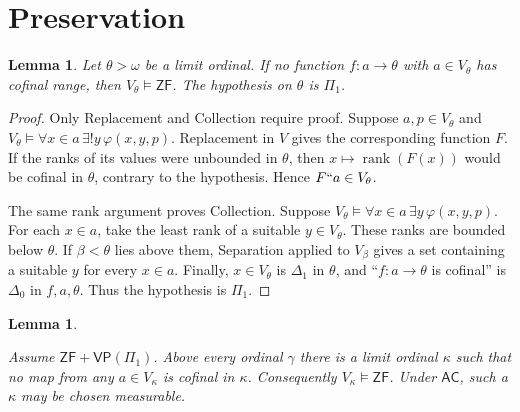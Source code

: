 \documentclass[11pt,a4paper]{amsart}
\newcommand{\VP}{\mathsf{VP}}
\newcommand{\AC}{\mathsf{AC}}
\newcommand{\ZF}{\mathsf{ZF}}
\newcommand{\rank}{\operatorname{rank}}
\theoremstyle{plain}
\newtheorem{lemma}[theorem]{Lemma}
\theoremstyle{definition}
\theoremstyle{remark}
\begin{document}
\section{Preservation}

\begin{lemma}\label{lem:ZF-rank-criterion}
Let $\theta>\omega$ be a limit ordinal.  If no function $f:a\to\theta$ with $a\in V_\theta$ has cofinal range, then $V_\theta\models\ZF$.  The hypothesis on $\theta$ is $\Pi_1$.
\end{lemma}

\begin{proof}
Only Replacement and Collection require proof.  Suppose $a,p\in V_\theta$ and $V_\theta\models\forall x\in a\,\exists!y\,\varphi(x,y,p)$.  Replacement in $V$ gives the corresponding function $F$.  If the ranks of its values were unbounded in $\theta$, then $x\mapsto\rank(F(x))$ would be cofinal in $\theta$, contrary to the hypothesis.  Hence $F``a\in V_\theta$.

The same rank argument proves Collection.  Suppose $V_\theta\models\forall x\in a\,\exists y\,\varphi(x,y,p)$.  For each $x\in a$, take the least rank of a suitable $y\in V_\theta$.  These ranks are bounded below $\theta$.  If $\beta<\theta$ lies above them, Separation applied to $V_\beta$ gives a set containing a suitable $y$ for every $x\in a$.  Finally, $x\in V_\theta$ is $\Delta_1$ in $\theta$, and ``$f:a\to\theta$ is cofinal'' is $\Delta_0$ in $f,a,\theta$.  Thus the hypothesis is $\Pi_1$.
\end{proof}

\begin{lemma}\label{lem:ZF-ranks}

Assume $\ZF+\VP(\Pi_1)$.  Above every ordinal $\gamma$ there is a limit ordinal $\kappa$ such that no map from any $a\in V_\kappa$ is cofinal in $\kappa$.  Consequently $V_\kappa\models\ZF$.  Under $\AC$, such a $\kappa$ may be chosen measurable.
\end{lemma}
\end{document}
